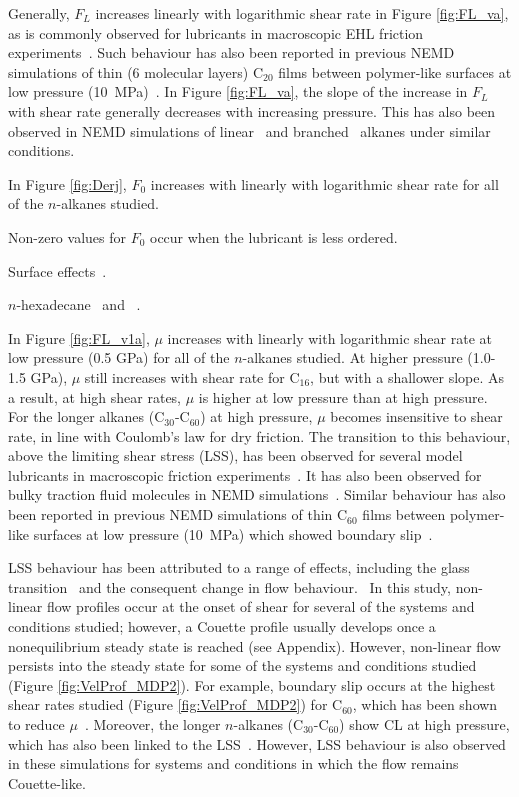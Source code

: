 \documentclass[5p]{elsarticle}
\begin{document}
Generally, $F_L$ increases linearly with logarithmic shear rate in Figure \ref{fig:FL_va}, as is commonly observed for lubricants in macroscopic EHL friction experiments~\cite{Spikes2014,Ewen2017a}. Such behaviour has also been reported in previous NEMD simulations of thin (6 molecular layers) C$_{20}$ films between polymer-like surfaces at low pressure (\SI{10}{\mega\pascal})~\cite{Sivebaek2010}. In Figure \ref{fig:FL_va}, the slope of the increase in $F_L$ with shear rate generally decreases with increasing pressure. This has also been observed in NEMD simulations of linear~\cite{Ta2017} and branched~\cite{Ewen2017a} alkanes under similar conditions.

In Figure \ref{fig:Derj}, $F_0$ increases with linearly with logarithmic shear rate for all of the $n$-alkanes studied. ~\cite{Sivebaek2016}

Non-zero values for $F_0$ occur when the lubricant is less ordered.~\cite{Eder2013}

Surface effects~\cite{Ta2015a,Ta2015b}.

$n$-hexadecane~\cite{Jabbarzadeh1998} and ~\cite{Tseng2009}.

In Figure \ref{fig:FL_v1a}, $\mu$ increases with linearly with logarithmic shear rate at low pressure (0.5 GPa) for all of the $n$-alkanes studied. At higher pressure (1.0-1.5 GPa), $\mu$ still increases with shear rate for C$_{16}$, but with a shallower slope. As a result, at high shear rates, $\mu$ is higher at low pressure than at high pressure. For the longer alkanes (C$_{30}$-C$_{60}$) at high pressure, $\mu$ becomes insensitive to shear rate, in line with Coulomb's law for dry friction. The transition to this behaviour, above the limiting shear stress (LSS), has been observed for several model lubricants in macroscopic friction experiments~\cite{Martinie2016a}. It has also been observed for bulky traction fluid molecules in NEMD simulations~\cite{Ewen2017a,Porras-Vazquez2018}. Similar behaviour has also been reported in previous NEMD simulations of thin C$_{60}$ films between polymer-like surfaces at low pressure (\SI{10}{\mega\pascal}) which showed boundary slip~\cite{Sivebaek2010}.

LSS behaviour has been attributed to a range of effects, including the glass transition~\cite{Porras-Vazquez2018} and the consequent change in flow behaviour.~\cite{Ewen2017a} In this study, non-linear flow profiles occur at the onset of shear for several of the systems and conditions studied; however, a Couette profile usually develops once a nonequilibrium steady state is reached (see Appendix). However, non-linear flow persists into the steady state for some of the systems and conditions studied (Figure \ref{fig:VelProf_MDP2}). For example, boundary slip occurs at the highest shear rates studied (Figure \ref{fig:VelProf_MDP2}) for C$_{60}$, which has been shown to reduce $\mu$~\cite{Sivebaek2010,Savio2012}. Moreover, the longer $n$-alkanes (C$_{30}$-C$_{60}$) show CL at high pressure, which has also been linked to the LSS~\cite{Ewen2017a}. However, LSS behaviour is also observed in these simulations for systems and conditions in which the flow remains Couette-like.
\end{document}
